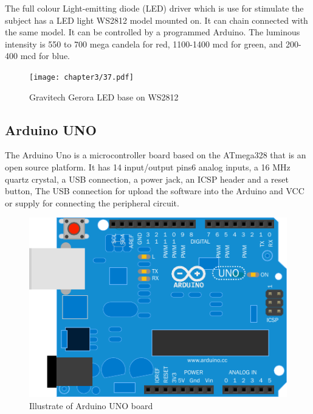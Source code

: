 \hspace{1.5cm} The full colour Light-emitting diode (LED) driver which is use for stimulate the subject has a LED light WS2812 model mounted on. It can chain connected with the same model. It can be controlled by a programmed Arduino. The luminous intensity is 550 to 700 mega candela for red, 1100-1400 mcd for green, and 200-400 mcd for blue.
\begin{figure}[h]
	\centering
	\texttt{[image: chapter3/37.pdf]}
	\caption{Gravitech Gerora LED base on WS2812}
\end{figure}
\subsection{Arduino UNO\cite{ref14}}

\hspace{1.5cm} The Arduino Uno is a microcontroller board based on the ATmega328 that is an open source platform. It has 14 input/output pins6 analog inputs, a 16 MHz quartz crystal, a USB connection, a power jack, an ICSP header and a reset button, The USB connection for upload the software into the Arduino and VCC or supply for connecting the peripheral circuit.   
\begin{figure}[h]
	\centering
	\includegraphics[scale = 0.5]{chapter3/38.pdf}
	\caption{Illustrate of Arduino UNO board}
\end{figure}